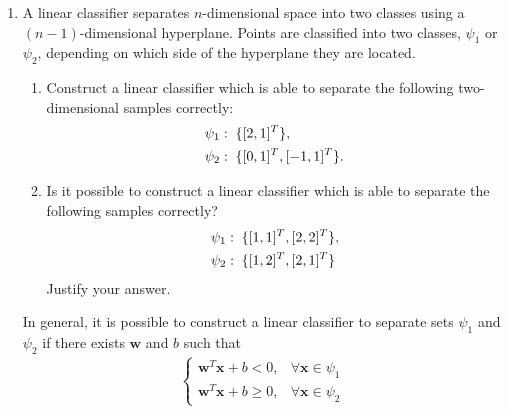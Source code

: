 \begin{enumerate}
\begin{solution}

  \end{solution}
  

\item A linear classifier separates $n$-dimensional
  space into two classes using a $(n-1)$-dimensional hyperplane. Points
  are classified into two classes, $\psi_1$ or $\psi_2$, depending on
  which side of the hyperplane they are located.
  \begin{enumerate}
  \item Construct a linear classifier which is able to separate the
    following two-dimensional samples correctly:
    \begin{align}
      &\psi_1: \text{\;} \{[2,1]^T\}, \notag \\
      &\psi_2: \text{\;} \{[0,1]^T, [-1,1]^T \}. \notag
    \end{align}
  \item Is it possible to construct a linear classifier which is able
    to separate the following samples correctly?
    \begin{align}
      &\psi_1:\text{\;} \{ [1,1]^T, [2,2]^T \}, \notag \\
      &\psi_2: \text{\;} \{ [1,2]^T,[2,1]^T \} \notag
    \end{align}
    Justify your answer.
  \end{enumerate}

  \begin{solution}

    In general, it is possible to construct a linear classifier to
    separate sets $\psi_1$ and $\psi_2$ if there exists
    $\mathbf{w}$ and $b$ such that
    \begin{align*}
      \begin{cases}
        \mathbf{w}^T\mathbf{x}+b<0, & \forall \mathbf{x} \in \psi_1
        \\
        \mathbf{w}^T\mathbf{x}+b\geq 0, & \forall \mathbf{x} \in \psi_2
      \end{cases}
    \end{align*}


\end{solution}
\end{enumerate}
